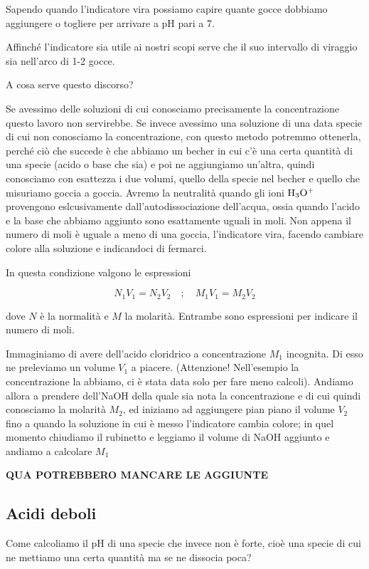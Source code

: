 Sapendo quando l'indicatore vira possiamo capire quante gocce dobbiamo aggiungere o togliere per arrivare a pH pari a 7.

Affinché l'indicatore sia utile ai nostri scopi serve che il suo intervallo di viraggio sia nell'arco di 1-2 gocce.

A cosa serve questo discorso?

Se avessimo delle soluzioni di cui conosciamo precisamente la concentrazione questo lavoro non servirebbe. Se invece avessimo una soluzione di una data specie di cui non conosciamo la concentrazione, con questo metodo potremmo ottenerla, perché ciò che succede è che abbiamo un becher in cui c'è una certa quantità di una specie (acido o base che sia) e poi ne aggiungiamo un'altra, quindi conosciamo con esattezza i due volumi, quello della specie nel becher e quello che misuriamo goccia a goccia. Avremo la neutralità quando gli ioni $\rm H_3O^+$ provengono eslcusivamente dall'autodissociazione dell'acqua, ossia quando l'acido e la base che abbiamo aggiunto sono esattamente uguali in moli. Non appena il numero di moli è uguale a meno di una goccia, l'indicatore vira, facendo cambiare colore alla soluzione e indicandoci di fermarci.

In questa condizione valgono le espressioni

$$N_1V_1=N_2V_2
\quad
;
\quad
M_1V_1=M_2V_2$$

dove $N$ è la normalità e $M$ la molarità. Entrambe sono espressioni per indicare il numero di moli.

Immaginiamo di avere dell'acido cloridrico a concentrazione $M_1$ incognita. Di esso ne preleviamo un volume $V_1$ a piacere. (Attenzione! Nell'esempio la concentrazione la abbiamo, ci è stata data solo per fare meno calcoli). Andiamo allora a prendere dell'NaOH della quale sia nota la concentrazione e di cui quindi conosciamo la molarità $M_2$, ed iniziamo ad aggiungere pian piano il volume $V_2$ fino a quando la soluzione in cui è messo l'indicatore cambia colore; in quel momento chiudiamo il rubinetto e leggiamo il volume di NaOH aggiunto e andiamo a calcolare $M_1$

\textbf{QUA POTREBBERO MANCARE LE AGGIUNTE}
\subsection{Acidi deboli}
Come calcoliamo il pH di una specie che invece non è forte, cioè una specie di cui ne mettiamo una certa quantità ma se ne dissocia poca?

